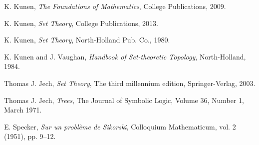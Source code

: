 \documentclass[12pt,a4paper]{report}
\theoremstyle{definition}
\theoremstyle{num.custom-title}
\begin{document}
\begin{thebibliography}{9}

K. Kunen, \emph{The Foundations of Mathematics}, College Publications, 2009.

K. Kunen, \emph{Set Theory}, College Publications, 2013.

K. Kunen, \emph{Set Theory}, North-Holland Pub. Co., 1980.

K. Kunen and J. Vaughan, \emph{Handbook of Set-theoretic Topology}, North-Holland, 1984.

Thomas J. Jech, \emph{Set Theory}, The third millennium edition, Springer-Verlag, 2003.

Thomas J. Jech, \emph{Trees}, The Journal of Symbolic Logic, Volume 36, Number 1, March 1971.

E. Specker, \emph{Sur un problème de Sikorski}, Colloquium Mathematicum, vol. 2 (1951), pp. 9--12.

\end{thebibliography}
\end{document}
